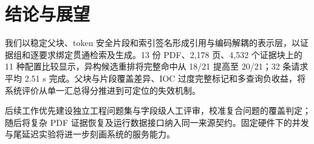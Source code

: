 \section{结论与展望}

我们以稳定父块、token 安全片段和索引签名形成引用与编码解耦的表示层，以证据组和逐要求绑定贯通检索及生成。13 份 PDF、2,178 页、4,532 个证据块上的 11 种配置比较显示，异构候选重排将完整命中从 18/21 提高至 20/21；32 条请求平均 2.51 s 完成。父块与片段覆盖差异、IOC 过度完整标记和多查询负收益，将系统评价从单一汇总得分推进到可定位的失效机制。

后续工作优先建设独立工程问题集与字段级人工评审，校准复合问题的覆盖判定；随后将复杂 PDF 证据恢复及运行数据接口纳入同一来源契约。固定硬件下的并发与尾延迟实验将进一步刻画系统的服务能力。
